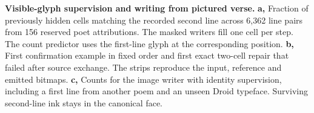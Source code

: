 \textbf{Visible-glyph supervision and writing from pictured verse.} \textbf{a,} Fraction of previously hidden cells matching the recorded second line across 6,362 line pairs from 156 reserved poet attributions. The masked writers fill one cell per step. The count predictor uses the first-line glyph at the corresponding position. \textbf{b,} First confirmation example in fixed order and first exact two-cell repair that failed after source exchange. The strips reproduce the input, reference and emitted bitmaps. \textbf{c,} Counts for the image writer with identity supervision, including a first line from another poem and an unseen Droid typeface. Surviving second-line ink stays in the canonical face.
